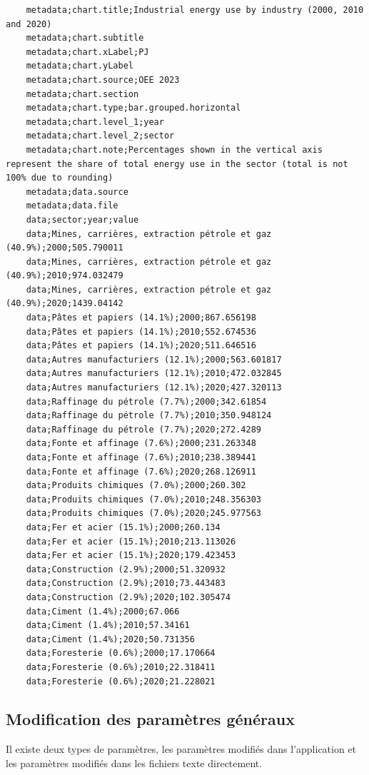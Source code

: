 \documentclass[11pt]{article}
\begin{document}
\begin{lstlisting}
    metadata;chart.title;Industrial energy use by industry (2000, 2010 and 2020)
    metadata;chart.subtitle
    metadata;chart.xLabel;PJ
    metadata;chart.yLabel
    metadata;chart.source;OEE 2023
    metadata;chart.section
    metadata;chart.type;bar.grouped.horizontal
    metadata;chart.level_1;year
    metadata;chart.level_2;sector
    metadata;chart.note;Percentages shown in the vertical axis represent the share of total energy use in the sector (total is not 100% due to rounding)
    metadata;data.source
    metadata;data.file
    data;sector;year;value
    data;Mines, carrières, extraction pétrole et gaz (40.9%);2000;505.790011
    data;Mines, carrières, extraction pétrole et gaz (40.9%);2010;974.032479
    data;Mines, carrières, extraction pétrole et gaz (40.9%);2020;1439.04142
    data;Pâtes et papiers (14.1%);2000;867.656198
    data;Pâtes et papiers (14.1%);2010;552.674536
    data;Pâtes et papiers (14.1%);2020;511.646516
    data;Autres manufacturiers (12.1%);2000;563.601817
    data;Autres manufacturiers (12.1%);2010;472.032845
    data;Autres manufacturiers (12.1%);2020;427.320113
    data;Raffinage du pétrole (7.7%);2000;342.61854
    data;Raffinage du pétrole (7.7%);2010;350.948124
    data;Raffinage du pétrole (7.7%);2020;272.4289
    data;Fonte et affinage (7.6%);2000;231.263348
    data;Fonte et affinage (7.6%);2010;238.389441
    data;Fonte et affinage (7.6%);2020;268.126911
    data;Produits chimiques (7.0%);2000;260.302
    data;Produits chimiques (7.0%);2010;248.356303
    data;Produits chimiques (7.0%);2020;245.977563
    data;Fer et acier (15.1%);2000;260.134
    data;Fer et acier (15.1%);2010;213.113026
    data;Fer et acier (15.1%);2020;179.423453
    data;Construction (2.9%);2000;51.320932
    data;Construction (2.9%);2010;73.443483
    data;Construction (2.9%);2020;102.305474
    data;Ciment (1.4%);2000;67.066
    data;Ciment (1.4%);2010;57.34161
    data;Ciment (1.4%);2020;50.731356
    data;Foresterie (0.6%);2000;17.170664
    data;Foresterie (0.6%);2010;22.318411
    data;Foresterie (0.6%);2020;21.228021
\end{lstlisting}


\subsection{Modification des paramètres généraux}
\label{subsec:modifParamGlobaux}

Il existe deux types de paramètres, les paramètres modifiés dans l'application et les paramètres modifiés dans les fichiers texte directement.
\end{document}
